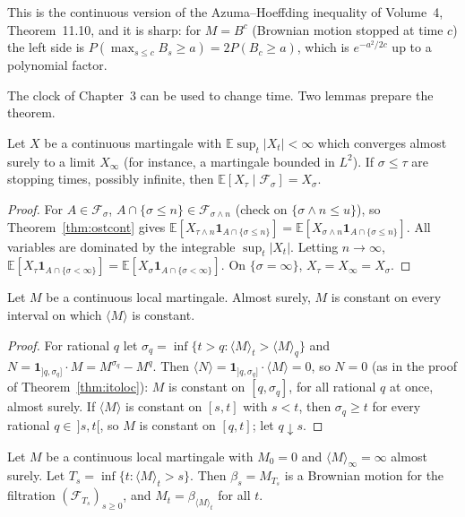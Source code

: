 This is the continuous version of the Azuma--Hoeffding inequality of Volume~4, Theorem~11.10, and it is sharp: for $M=B^{c}$ (Brownian motion stopped at time $c$) the left side is $P(\max_{s\le c}B_s\ge a)=2P(B_c\ge a)$,
which is $e^{-a^2/2c}$ up to a polynomial factor.

The clock of Chapter~3 can be used to change time. Two lemmas prepare the theorem.

\begin{lemma}\label{lem:ostL2}
Let $X$ be a continuous martingale with $\mathbb E\sup_t|X_t|<\infty$ which converges almost surely to a limit $X_\infty$ (for instance, a martingale bounded in $L^2$). If $\sigma\le\tau$ are stopping times, possibly infinite, then $\mathbb E[X_\tau\mid\mathcal F_\sigma]=X_\sigma$.
\end{lemma}

\begin{proof}
For $A\in\mathcal F_\sigma$, $A\cap\{\sigma\le n\}\in\mathcal F_{\sigma\wedge n}$ (check on $\{\sigma\wedge n\le u\}$), so Theorem~\ref{thm:ostcont} gives $\mathbb E[X_{\tau\wedge n}\mathbf 1_{A\cap\{\sigma\le n\}}]=\mathbb E[X_{\sigma\wedge n}\mathbf 1_{A\cap\{\sigma\le n\}}]$. All
variables are dominated by the integrable $\sup_t|X_t|$. Letting $n\to\infty$, $\mathbb E[X_\tau\mathbf 1_{A\cap\{\sigma<\infty\}}]=\mathbb E[X_\sigma\mathbf 1_{A\cap\{\sigma<\infty\}}]$. On $\{\sigma=\infty\}$, $X_\tau=X_\infty=X_\sigma$.
\end{proof}

\begin{lemma}\label{lem:constancy}
Let $M$ be a continuous local martingale. Almost surely, $M$ is constant on every interval on which $\langle M\rangle$ is constant.
\end{lemma}

\begin{proof}
For rational $q$ let $\sigma_q=\inf\{t>q:\langle M\rangle_t>\langle M\rangle_q\}$ and $N=\mathbf 1_{]q,\sigma_q]}\cdot M=M^{\sigma_q}-M^q$. Then $\langle N\rangle=\mathbf 1_{]q,\sigma_q]}\cdot\langle M\rangle=0$, so $N=0$ (as in the proof of
Theorem~\ref{thm:itoloc}): $M$ is constant on $[q,\sigma_q]$, for all rational $q$ at once, almost surely. If $\langle M\rangle$ is constant on $[s,t]$ with $s<t$, then $\sigma_q\ge t$ for every rational $q\in\,]s,t[$, so $M$ is
constant on $[q,t]$; let $q\downarrow s$.
\end{proof}

\begin{theorem}\label{thm:dds}
Let $M$ be a continuous local martingale with $M_0=0$ and $\langle M\rangle_\infty=\infty$ almost surely. Let $T_s=\inf\{t:\langle M\rangle_t>s\}$. Then $\beta_s=M_{T_s}$ is a Brownian motion for the filtration
$(\mathcal F_{T_s})_{s\ge0}$, and $M_t=\beta_{\langle M\rangle_t}$ for all $t$.
\end{theorem}

